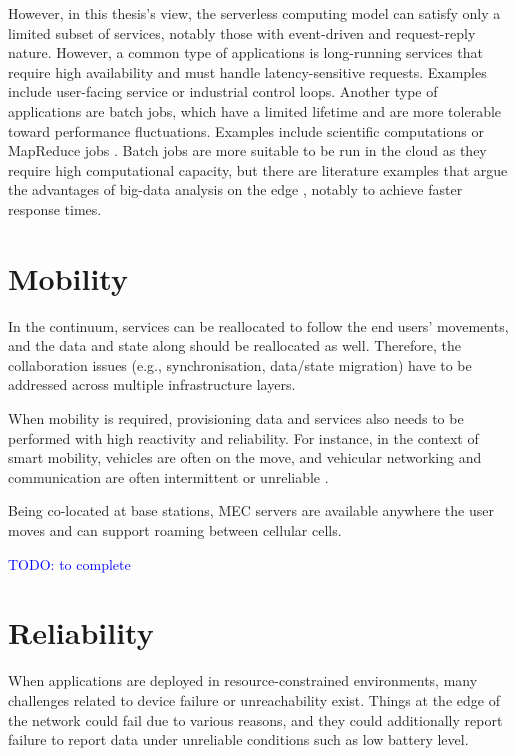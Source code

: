 However, in this thesis's view, the serverless computing model can satisfy only a limited subset of services, notably those with event-driven and request-reply nature. However, a common type of applications is long-running services that require high availability and must handle latency-sensitive requests. Examples include user-facing service or industrial control loops. Another type of applications are batch jobs, which have a limited lifetime and are more tolerable toward performance fluctuations. Examples include scientific computations or MapReduce jobs \cite{map-reduce}. Batch jobs are more suitable to be run in the cloud as they require high computational capacity, but there are literature examples that argue the advantages of big-data analysis on the edge \cite{data-analytics-iot}, notably to achieve faster response times.

\section{Mobility}

In the continuum, services can be reallocated to follow the end users' movements, and the data and state along should be reallocated as well. Therefore, the collaboration issues (e.g., synchronisation, data/state migration) have to be addressed across multiple infrastructure layers.

When mobility is required, provisioning data and services also needs to be performed with high reactivity and reliability. For instance, in the context of smart mobility, vehicles are often on the move, and vehicular networking and communication are often intermittent or unreliable \cite{vehicular-data-cloud}.

Being co-located at base stations, MEC servers are available anywhere the user moves and can support roaming between cellular cells.

\textcolor{blue}{TODO: to complete}

\section{Reliability}

When applications are deployed in resource-constrained environments, many challenges related to device failure or unreachability exist. Things at the edge of the network could fail due to various reasons, and they could additionally report failure to report data under unreliable conditions such as low battery level.

